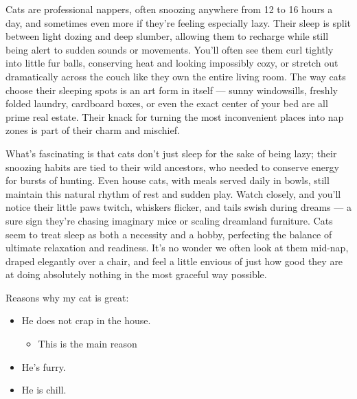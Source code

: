 \documentclass[11pt,a4paper]{report}
\begin{document}
Cats are professional nappers, often snoozing anywhere from 12 to 16 hours a day, and sometimes even more if they’re feeling especially lazy. Their sleep is split between light dozing and deep slumber, allowing them to recharge while still being alert to sudden sounds or movements. You’ll often see them curl tightly into little fur balls, conserving heat and looking impossibly cozy, or stretch out dramatically across the couch like they own the entire living room. The way cats choose their sleeping spots is an art form in itself — sunny windowsills, freshly folded laundry, cardboard boxes, or even the exact center of your bed are all prime real estate. Their knack for turning the most inconvenient places into nap zones is part of their charm and mischief.

What’s fascinating is that cats don’t just sleep for the sake of being lazy; their snoozing habits are tied to their wild ancestors, who needed to conserve energy for bursts of hunting. Even house cats, with meals served daily in bowls, still maintain this natural rhythm of rest and sudden play. Watch closely, and you’ll notice their little paws twitch, whiskers flicker, and tails swish during dreams — a sure sign they’re chasing imaginary mice or scaling dreamland furniture. Cats seem to treat sleep as both a necessity and a hobby, perfecting the balance of ultimate relaxation and readiness. It’s no wonder we often look at them mid-nap, draped elegantly over a chair, and feel a little envious of just how good they are at doing absolutely nothing in the most graceful way possible.

Reasons why my cat is great:

\begin{itemize}
    \item He does not crap in the house.
        \begin{itemize}
            \item{This is the main reason}
        \end{itemize}
    \item He's furry.
    \item He is chill.
\end{itemize}
\end{document}
